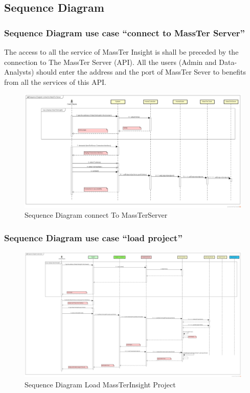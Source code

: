 	\subsection{Sequence Diagram}
	\subsubsection{Sequence Diagram use case ``connect to MassTer Server''}
	The access to all the service of MassTer Insight is shall be preceded by the connection to The MassTer Server (API). All the users (Admin and Data-Analysts) should enter the address and the port of MassTer Sever to benefits from all the services of this API.
	
	\begin{figure}[h]
		\centering
		\includegraphics[width=1\textwidth]{SequenceDiagramconnectToMassTerServer.png}
		\caption{Sequence Diagram connect To MassTerServer}
	\end{figure}   
	\clearpage
	\newpage
	\subsubsection{Sequence Diagram use case ``load project''}

	
		\begin{figure}[h]
		\centering
		\includegraphics[width=1\textwidth]{SequenceDiagramLoadProject.png}
		\caption{Sequence Diagram Load MassTerInsight Project}
	\end{figure}
	\clearpage
	\newpage
